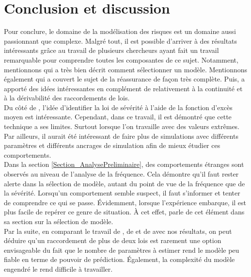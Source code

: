 \section{Conclusion et discussion}\label{Sect_Conclusion}
	Pour conclure, le domaine de la modélisation des risques est un domaine aussi passionnant que complexe. Malgré tout, il est possible d'arriver à des résultats intéressants grâce au travail de plusieurs chercheurs ayant fait un travail remarquable pour comprendre toutes les composantes de ce sujet. Notamment, mentionnons \cite{LossModels_Klugman2012} qui a très bien décrit comment sélectionner un modèle. Mentionnons également \cite{albrecher2017reinsurance} qui a couvert le sujet de la réassurance de façon très complète. Puis, \cite{brazauskas2016modeling} a apporté des idées intéressantes en complément de \cite{albrecher2017reinsurance} relativement à la continuité et à la dérivabilité des raccordements de lois.\\
	
	Du côté de \cite{Embrechts1994}, l'idée d'identifier la loi de sévérité à l'aide de la fonction d'excès moyen est intéressante. Cependant, dans ce travail, il est démontré que cette technique a ses limites. Surtout lorsque l'on travaille avec des valeurs extrêmes. Par ailleurs, il aurait été intéressant de faire plus de simulations avec différents paramètres et différents ancrages de simulation afin de mieux étudier ces comportements.\\
	
	Dans la section \ref{Section_AnalysePreliminaire}, des comportements étranges sont observés au niveau de l'analyse de la fréquence. Cela démontre qu'il faut rester alerte dans la sélection de modèle, autant du point de vue de la fréquence que de la sévérité. Lorsqu'un comportement semble suspect, il faut s'informer et tenter de comprendre ce qui se passe. Évidemment, lorsque l'expérience embarque, il est plus facile de repérer ce genre de situation. À cet effet, \cite{LossModels_Klugman2012} parle de cet élément dans sa section sur la sélection de modèle.\\
	
	Par la suite, en comparant le travail de \cite{albrecher2017reinsurance}, de \cite{brazauskas2016modeling} et de \cite{LossModels_Klugman2012} avec nos résultats, on peut déduire qu'un raccordement de plus de deux lois est rarement une option envisageable du fait que le nombre de paramètres à estimer rend le modèle peu fiable en terme de pouvoir de prédiction. Également, la complexité du modèle engendré le rend difficile à travailler.\\
	
